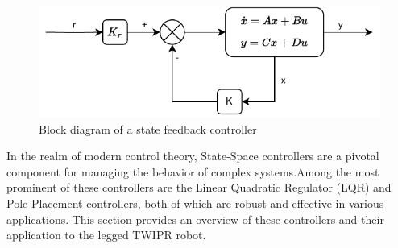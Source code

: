 \begin{figure}[h]
	\centering
	\includegraphics[width=.5\textwidth]{Block Diagram of State Feedback Controller}
	\caption{Block diagram of a state feedback controller}
	\label{fig:Block diagram of a state feedback controller}
\end{figure}


In the realm of modern control theory, State-Space controllers are a pivotal component for managing the behavior of complex systems.Among the most prominent of these controllers are the Linear Quadratic Regulator (LQR) and Pole-Placement controllers, both of which are robust and effective in various applications.
This section provides an overview of these controllers and their application to the legged TWIPR robot.

